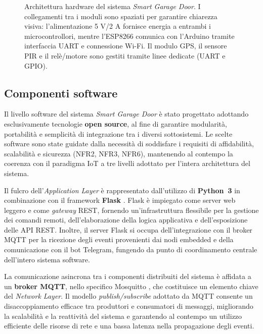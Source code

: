 \begin{figure}[H]

\caption{Architettura hardware del sistema \textit{Smart Garage Door}.  
I collegamenti tra i moduli sono spaziati per garantire chiarezza visiva:
l’alimentazione 5 V/2 A fornisce energia a entrambi i microcontrollori,
mentre l’ESP8266 comunica con l’Arduino tramite interfaccia UART e connessione Wi-Fi.  
Il modulo GPS, il sensore PIR e il relè/motore sono gestiti tramite linee dedicate (UART e GPIO).}
\label{fig:hardware_architecture}
\end{figure}


\subsection{Componenti software}

Il livello software del sistema \textit{Smart Garage Door} è stato progettato
adottando esclusivamente tecnologie \textbf{open source}, al fine di garantire
modularità, portabilità e semplicità di integrazione tra i diversi sottosistemi.
Le scelte software sono state guidate dalla necessità di soddisfare i requisiti
di affidabilità, scalabilità e sicurezza (NFR2, NFR3, NFR6), mantenendo al
contempo la coerenza con il paradigma IoT a tre livelli adottato per l’intera
architettura del sistema.

Il fulcro dell’\textit{Application Layer} è rappresentato dall’utilizzo di
\textbf{Python~3} in combinazione con il framework \textbf{Flask}
\cite{Flask2024}. Flask è impiegato come server web leggero e come
\textit{gateway} REST, fornendo un’infrastruttura flessibile per la gestione dei
comandi remoti, dell’elaborazione della logica applicativa e dell’esposizione
delle API REST. Inoltre, il server Flask si occupa dell’integrazione con il
broker MQTT per la ricezione degli eventi provenienti dai nodi embedded e della
comunicazione con il bot Telegram, fungendo da punto di coordinamento centrale
dell’intero sistema software.

La comunicazione asincrona tra i componenti distribuiti del sistema è affidata a
un \textbf{broker MQTT}, nello specifico Mosquitto \cite{MQTTspec}, che
costituisce un elemento chiave del \textit{Network Layer}. Il modello
\textit{publish/subscribe} adottato da MQTT consente un disaccoppiamento
efficace tra produttori e consumatori di messaggi, migliorando la scalabilità e
la reattività del sistema e garantendo al contempo un utilizzo efficiente delle
risorse di rete e una bassa latenza nella propagazione degli eventi.

